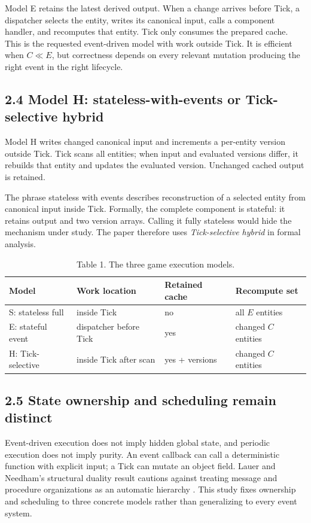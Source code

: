Model E retains the latest derived output. When a change arrives before Tick, a dispatcher selects the entity, writes its canonical input, calls a component handler, and recomputes that entity. Tick only consumes the prepared cache. This is the requested event-driven model with work outside Tick. It is efficient when \(C \ll E\), but correctness depends on every relevant mutation producing the right event in the right lifecycle.

\subsection{2.4 Model H: stateless-with-events or Tick-selective hybrid}

Model H writes changed canonical input and increments a per-entity version outside Tick. Tick scans all entities; when input and evaluated versions differ, it rebuilds that entity and updates the evaluated version. Unchanged cached output is retained.

The phrase stateless with events describes reconstruction of a selected entity from canonical input inside Tick. Formally, the complete component is stateful: it retains output and two version arrays. Calling it fully stateless would hide the mechanism under study. The paper therefore uses \emph{Tick-selective hybrid} in formal analysis.

\begin{table}
\caption{Table 1. The three game execution models.}
\begin{tabular}{llll}
Model & Work location & Retained cache & Recompute set \\
\hline
S: stateless full & inside Tick & no & all \(E\) entities \\
E: stateful event & dispatcher before Tick & yes & changed \(C\) entities \\
H: Tick-selective & inside Tick after scan & yes + versions & changed \(C\) entities \\
\end{tabular}
\end{table}

\subsection{2.5 State ownership and scheduling remain distinct}

Event-driven execution does not imply hidden global state, and periodic execution does not imply purity. An event callback can call a deterministic function with explicit input; a Tick can mutate an object field. Lauer and Needham's structural duality result cautions against treating message and procedure organizations as an automatic hierarchy \cite{lauer1979}. This study fixes ownership and scheduling to three concrete models rather than generalizing to every event system.


